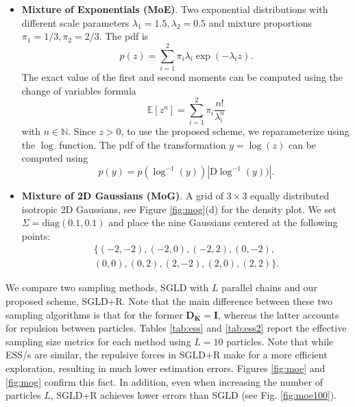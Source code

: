 \begin{itemize}
\setlength\itemsep{-0.2em}
\item \textbf{Mixture of Exponentials (MoE)}. Two exponential distributions with different scale parameters $\lambda_1 = 1.5, \lambda_2=0.5$ and mixture proportions $\pi_1 = 1/3, \pi_2 = 2/3$. The pdf is
$$ 
p(z) = \sum_{i=1}^2 \pi_{i}\lambda_i \exp(-\lambda_i z).
$$
The exact value of the first and second moments can be computed using the change of variables formula
\begin{equation*}
\mathbb{E} \left[z^n \right] = \sum_{i=1}^2 \pi_{i}\frac{n!}{\lambda_i^n}
\end{equation*}
with $n\in \mathbb{N}$. 
Since $z>0$, to use the proposed scheme, we reparameterize using the $\log$ function. The pdf of the transformation $y = \log(z)$ can be computed using
\begin{equation*}
p(y) = p(\log^{-1}(y))|\mbox{D} \log^{-1}(y))|.
\end{equation*}
\item \textbf{Mixture of 2D Gaussians (MoG)}. A grid of $3 \times 3$ equally distributed isotropic 2D Gaussians, see Figure \ref{fig:mog}(d) for the density plot.  We set $\Sigma = \mbox{diag} (0.1, 0.1)$ and place the nine Gaussians centered at the following points:
\begin{align*}
\lbrace (-2,-2), (-2, 0), (-2, 2), (0, -2), \\(0, 0), (0, 2), (2, -2), (2, 0), (2, 2)  \rbrace.
\end{align*}
\end{itemize}
We compare two sampling methods, SGLD with $L$ parallel chains and our proposed scheme, SGLD+R. Note that the main difference between these two sampling algorithms is that for the former $\mathbf{D_K} = \mathbf{I}$, whereas the latter accounts for repulsion between particles. Tables \ref{tab:ess} and \ref{tab:ess2} report the effective sampling size metrics \cite{kass1998markov} for each method using $L=10$ particles. Note that while ESS/s are similar, the repulsive forces in SGLD+R make for a more efficient exploration, resulting in much lower estimation errors. Figures \ref{fig:moe} and \ref{fig:mog} confirm this fact. In addition, even when increasing the number of particles $L$, SGLD+R achieves lower errors than SGLD (see Fig. \ref{fig:moe100}).


